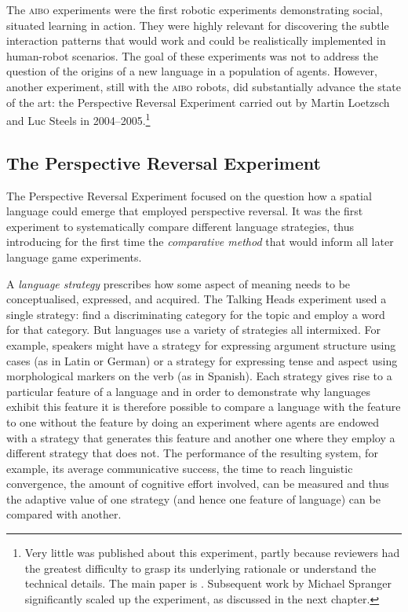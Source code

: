 The \textsc{aibo} experiments were the first robotic experiments demonstrating social, situated learning in action. 
They were highly relevant for discovering the subtle interaction patterns that would work and 
could be realistically implemented in human-robot scenarios. The goal of these experiments was 
not to address the question of the origins of a 
new language in a population of agents. However, another experiment, still with the \textsc{aibo} robots,  
did substantially advance the state of the art: the Perspective Reversal Experiment carried out by Martin Loetzsch 
and Luc Steels in 2004--2005.\footnote{
Very little was published about this experiment, partly because reviewers had the greatest difficulty to grasp 
its underlying rationale or understand the technical details. The main paper is \cite{Steels:2008spatial}. 
Subsequent work by Michael Spranger significantly scaled up the experiment, as discussed in the next chapter.}

\subsection{The Perspective Reversal Experiment}

The Perspective Reversal Experiment  focused on the question how a spatial language could emerge that employed
perspective reversal. It was the first experiment to systematically compare different language strategies, thus 
introducing for the first time the {\itshape comparative method}  
that would inform all later language game experiments. 

A {\itshape language strategy}  
prescribes how some aspect of meaning needs to be conceptualised, expressed, and acquired. 
The Talking Heads experiment used a single strategy: find a discriminating category for the topic and employ a word 
for that category. But languages use a variety of strategies all intermixed. 
For example, speakers might have a strategy for expressing argument structure using cases (as in Latin or German) or 
a strategy for expressing tense and aspect using morphological markers on the verb (as in Spanish). Each strategy gives 
rise to a particular feature of a language and in order to demonstrate why languages exhibit this feature it is therefore
possible to compare a language with the feature to one without the feature by doing an experiment where
agents are endowed with a strategy that generates this feature and another one where they employ a different strategy
that does not. The performance of the resulting system, for example, its average communicative success, the time to reach 
linguistic convergence, the amount of cognitive effort involved, can be measured and thus the adaptive value of one 
strategy (and hence one feature of language) can be compared with another. 

